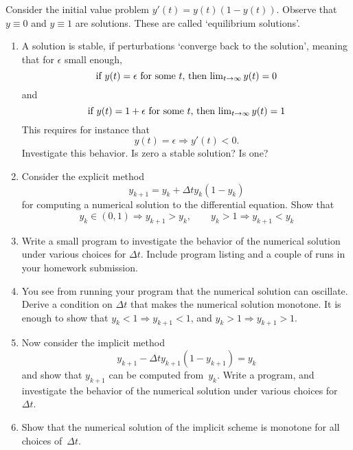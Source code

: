 \begin{exercise}
  Consider the initial value problem $y'(t)=y(t)(1-y(t))$.
Observe that $y\equiv 0$ and $y\equiv 1$ are solutions. These are called `equilibrium solutions'.
\begin{enumerate}
\item A solution is stable, if perturbations `converge back to the
  solution', meaning that for $\epsilon$ small enough,
  \begin{equation}
    \hbox{if  $y(t)=\epsilon$ for some~$t$, then
      $\lim_{t\rightarrow\infty}y(t)=0$}
  \end{equation}
  and
  \begin{equation}
    \hbox{if  $y(t)=1+\epsilon$ for some~$t$, then
      $\lim_{t\rightarrow\infty}y(t)=1$}
  \end{equation}
  This requires for instance that \begin{equation}
    y(t)=\epsilon\Rightarrow y'(t)<0.
  \end{equation}
  Investigate this behavior. Is zero a stable solution? Is one?
\item Consider the explicit method 
  \begin{equation}
    y_{k+1}=y_k+\Delta t y_k(1-y_k)
  \end{equation}
  for computing a numerical solution
  to the differential equation. Show that
  \begin{equation}
    y_k\in(0,1)\Rightarrow y_{k+1}>y_k,\qquad
    y_k>1\Rightarrow y_{k+1}<y_k
  \end{equation}
\item Write a small program to investigate the behavior of the
  numerical solution under various choices for $\Delta t$. Include
  program listing and a couple of runs in your homework submission.
\item You see from running your program that the numerical solution
  can oscillate. Derive a condition on $\Delta t$ that makes the
  numerical solution monotone. It is enough to show that
  $y_k<1\Rightarrow y_{k+1}<1$, and $y_k>1\Rightarrow y_{k+1}>1$.
\item Now consider the implicit method
  \begin{equation}
    y_{k+1}-\Delta t y_{k+1}(1-y_{k+1})=y_k
  \end{equation}
  and show that $y_{k+1}$ can be computed from~$y_k$. Write a program, and investigate the
  behavior of the numerical solution under various choices
  for~$\Delta t$.
\item Show that the numerical solution of the implicit scheme is
  monotone for all choices of~$\Delta t$.
\end{enumerate}
\end{exercise}

